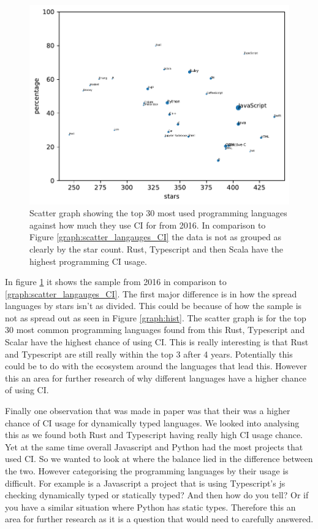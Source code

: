 \documentclass[twoside,12pt,titlepage,a4paper]{article}
\begin{document}
\begin{figure}[!h]
  \centering
  \includegraphics[width=.8\textwidth]{../src/results/scatter.pdf}
  \caption{Scatter graph showing the top 30 most used programming languages against how much they use CI for \citet{Hilton2016} from 2016. In comparison to Figure \ref{graph:scatter_langauges_CI} the data is not as grouped as clearly by the star count. Rust, Typescript and then Scala have the highest programming CI usage.}
  \label{graph:scatter_langauges_CI_2016}
\end{figure}

In figure \ref{graph:scatter_langauges_CI_2016} it shows the sample from 2016 in comparison to \ref{graph:scatter_langauges_CI}. The first major difference is in how the spread languages by stars isn't as divided. This could be because of how the sample is not as spread out as seen in Figure \ref{graph:hist}. The scatter graph is for the top 30 most common programming languages found from this Rust, Typescript and Scalar have the highest chance of using CI. This is really interesting is that Rust and Typescript are still really within the top 3 after 4 years. Potentially this could be to do with the ecosystem around the languages that lead this. However this an area for further research of why different languages have a higher chance of using CI. 

Finally one observation that was made in \citet{Hilton2016} paper was that their was a higher chance of CI usage for dynamically typed languages. We looked into analysing this as we found both Rust and Typescript having really high CI usage chance. Yet at the same time overall Javascript and Python had the most projects that used CI. So we wanted to look at where the balance lied in the difference between the two. However categorising the programming languages by their usage is difficult. For example is a Javascript a project that is using Typescript's js checking dynamically typed or statically typed? And then how do you tell? Or if you have a similar situation where Python has static types. Therefore this an area for further research as it is a question that would need to carefully answered.
\end{document}
